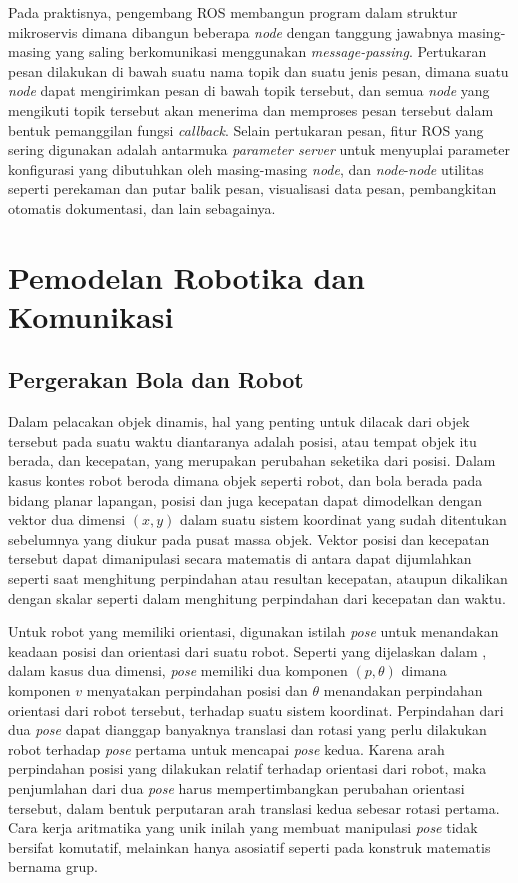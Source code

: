 Pada praktisnya, pengembang ROS membangun program dalam struktur mikroservis dimana dibangun beberapa \textit{node} dengan tanggung jawabnya masing-masing yang saling berkomunikasi menggunakan \textit{message-passing}. Pertukaran pesan dilakukan di bawah suatu nama topik dan suatu jenis pesan, dimana suatu \textit{node} dapat mengirimkan pesan di bawah topik tersebut, dan semua \textit{node} yang mengikuti topik tersebut akan menerima dan memproses pesan tersebut dalam bentuk pemanggilan fungsi \textit{callback}. Selain pertukaran pesan, fitur ROS yang sering digunakan adalah antarmuka \textit{parameter server} untuk menyuplai parameter konfigurasi yang dibutuhkan oleh masing-masing \textit{node}, dan \textit{node}-\textit{node} utilitas seperti perekaman dan putar balik pesan, visualisasi data pesan, pembangkitan otomatis dokumentasi, dan lain sebagainya.

\section{Pemodelan Robotika dan Komunikasi}

\subsection{Pergerakan Bola dan Robot}

Dalam pelacakan objek dinamis, hal yang penting untuk dilacak dari objek tersebut pada suatu waktu diantaranya adalah posisi, atau tempat objek itu berada, dan kecepatan, yang merupakan perubahan seketika dari posisi. Dalam kasus kontes robot beroda dimana objek seperti robot, dan bola berada pada bidang planar lapangan, posisi dan juga kecepatan dapat dimodelkan dengan vektor dua dimensi $(x, y)$ dalam suatu sistem koordinat yang sudah ditentukan sebelumnya yang diukur pada pusat massa objek. Vektor posisi dan kecepatan tersebut dapat dimanipulasi secara matematis di antara dapat dijumlahkan seperti saat menghitung perpindahan atau resultan kecepatan, ataupun dikalikan dengan skalar seperti dalam menghitung perpindahan dari kecepatan dan waktu.

Untuk robot yang memiliki orientasi, digunakan istilah \textit{pose} untuk menandakan keadaan posisi dan orientasi dari suatu robot. Seperti yang dijelaskan dalam \citet{thrun2010}, dalam kasus dua dimensi, \textit{pose} memiliki dua komponen $(p, \theta)$ dimana komponen $v$ menyatakan perpindahan posisi dan $\theta$ menandakan perpindahan orientasi dari robot tersebut, terhadap suatu sistem koordinat. Perpindahan dari dua \textit{pose} dapat dianggap banyaknya translasi dan rotasi yang perlu dilakukan robot terhadap \textit{pose} pertama untuk mencapai \textit{pose} kedua. Karena arah perpindahan posisi yang dilakukan relatif terhadap orientasi dari robot, maka penjumlahan dari dua \textit{pose} harus mempertimbangkan perubahan orientasi tersebut, dalam bentuk perputaran arah translasi kedua sebesar rotasi pertama. Cara kerja aritmatika yang unik inilah yang membuat manipulasi \textit{pose} tidak bersifat komutatif, melainkan hanya asosiatif seperti pada konstruk matematis bernama grup.

